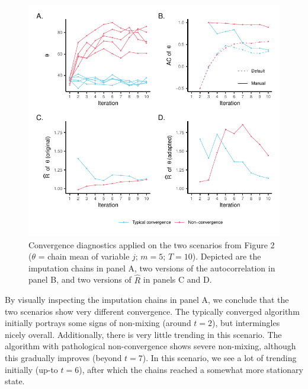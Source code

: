 \documentclass[Royal,times,sageh]{sagej}
\begin{document}
\begin{figure}

{\centering \includegraphics{2.Manuscript_files/figure-latex/diagnostics-1} 

}

\caption{Convergence diagnostics applied on the two scenarios from Figure 2 ($\theta$ = chain mean of variable $j$; $m=5$; $T=10$). Depicted are the imputation chains in panel A, two versions of the autocorrelation in panel B, and two versions of $\widehat{R}$ in panels C and D.}\label{fig:diagnostics}
\end{figure}

By visually inspecting the imputation chains in panel A, we conclude that the two scenarios show very different convergence. The typically converged algorithm initially portrays some signs of non-mixing (around \(t=2\)), but intermingles nicely overall. Additionally, there is very little trending in this scenario. The algorithm with pathological non-convergence shows severe non-mixing, although this gradually improves (beyond \(t=7\)). In this scenario, we see a lot of trending initially (up-to \(t=6\)), after which the chains reached a somewhat more stationary state.
\end{document}
